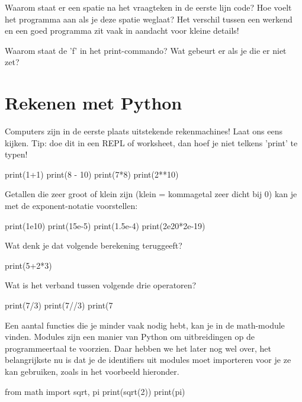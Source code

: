 \documentclass[10pt,a4paper]{article}
\newenvironment{task}{\smallpencil}{}
\begin{document}
\begin{task}
Waarom staat er een spatie na het vraagteken in de eerste lijn code? Hoe voelt het programma aan als je deze spatie weglaat? Het verschil tussen een werkend en een goed programma zit vaak in aandacht voor kleine details!
\end{task}

\begin{task}
Waarom staat de 'f' in het print-commando? Wat gebeurt er als je die er niet zet?
\end{task}


\section{Rekenen met Python}
Computers zijn in de eerste plaats uitstekende rekenmachines! Laat ons eens kijken. Tip: doe dit in een REPL of worksheet, dan hoef je niet telkens 'print' te typen!

\begin{python}
print(1+1)
print(8 - 10)
print(7*8)
print(2**10)
\end{python}

Getallen die zeer groot of klein zijn (klein = kommagetal zeer dicht bij 0) kan je met de exponent-notatie voorstellen:
\begin{python}
print(1e10)
print(15e-5)
print(1.5e-4)
print(2e20*2e-19)
\end{python}

\begin{task}
Wat denk je dat volgende berekening teruggeeft?
\end{task}
\begin{python}
print(5+2*3)
\end{python}

\begin{task}
Wat is het verband tussen volgende drie operatoren?
\end{task}
\begin{python}
print(7/3)
print(7//3)
print(7%
\end{python}

Een aantal functies die je minder vaak nodig hebt, kan je in de math-module vinden. Modules zijn een manier van Python om uitbreidingen op de programmeertaal te voorzien. Daar hebben we het later nog wel over, het belangrijkste nu is dat je de identifiers uit modules moet importeren voor je ze kan gebruiken, zoals in het voorbeeld hieronder.
\begin{python}
from math import sqrt, pi
print(sqrt(2))
print(pi)
\end{python}
\end{document}
